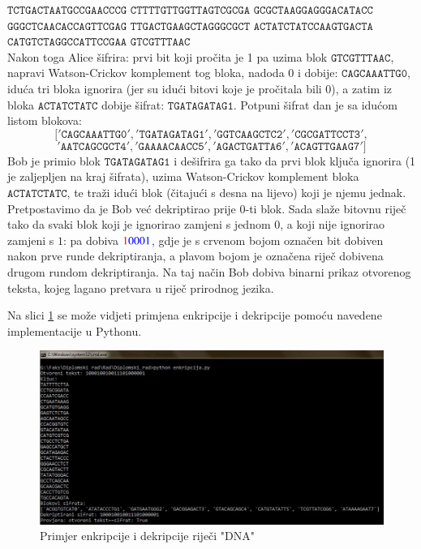 \documentclass[a4paper,oneside,12pt]{memoir} %
\begin{document}
\begin{spacing}{1.5}
\begin{exa}
$\mathtt{TCTGACTAAT GCCGAACCCG}$
$\mathtt{CTTTTGTTGG TTAGTCGCGA}$
$\mathtt{GCGCTAAGGA GGGACATACC}$\\
$\mathtt{GGGCTCAACA CCAGTTCGAG}$
$\mathtt{TTGACTGAAG CTAGGGCGCT}$
$\mathtt{ACTATCTATC CAAGTGACTA}$\\
$\mathtt{CATGTCTAGG CCATTCCGAA}$
$\mathtt{GTCGTTTAAC}$ \\
Nakon toga Alice šifrira: prvi bit koji pročita je 1 pa uzima blok $\mathtt{GTCGTTTAAC}$, napravi Watson-Crickov komplement tog bloka, nadoda $0$ i dobije: $\mathtt{CAGCAAATTG0}$, iduća tri bloka ignorira (jer su idući bitovi koje je pročitala bili $0$), a zatim iz bloka $\mathtt{ACTATCTATC}$ dobije šifrat: $\mathtt{TGATAGATAG1}$. Potpuni šifrat dan je sa idućom listom blokova:
\[\mathtt{['CAGCAAATTG0', 'TGATAGATAG1', 'GGTCAAGCTC2', 'CGCGATTCCT3',}\] \[\mathtt{'AATCAGCGCT4', 'GAAAACAACC5', 'AGACTGATTA6', 'ACAGTTGAAG7']}\]
Bob je primio blok $\mathtt{TGATAGATAG1}$ i dešifrira ga tako da prvi blok ključa ignorira (1 je zaljepljen na kraj šifrata), uzima Watson-Crickov komplement bloka $\mathtt{ACTATCTATC}$, te traži idući blok (čitajući s desna na lijevo) koji je njemu jednak. Pretpostavimo da je Bob već dekriptirao prije $0$-ti blok. Sada slaže bitovnu riječ tako da svaki blok koji je ignorirao zamjeni s jednom $0$, a koji nije ignorirao zamjeni s $1$: pa dobiva ${\color{red}1} {\color{blue}0001}$, gdje je s crvenom bojom označen bit dobiven nakon prve runde dekriptiranja, a plavom bojom je označena riječ dobivena drugom rundom dekriptiranja. Na taj način Bob dobiva binarni prikaz otvorenog teksta, kojeg lagano pretvara u riječ prirodnog jezika.
\end{exa}
Na slici \ref{fig:prim} se može vidjeti primjena enkripcije i dekripcije pomoću navedene implementacije u Pythonu.  
\begin{figure}[h]
\centering \includegraphics[scale=0.5]{primjer.jpg}
\caption{Primjer enkripcije i dekripcije riječi "DNA"}
\label{fig:prim}
\end{figure}


\end{spacing}
\end{document}
